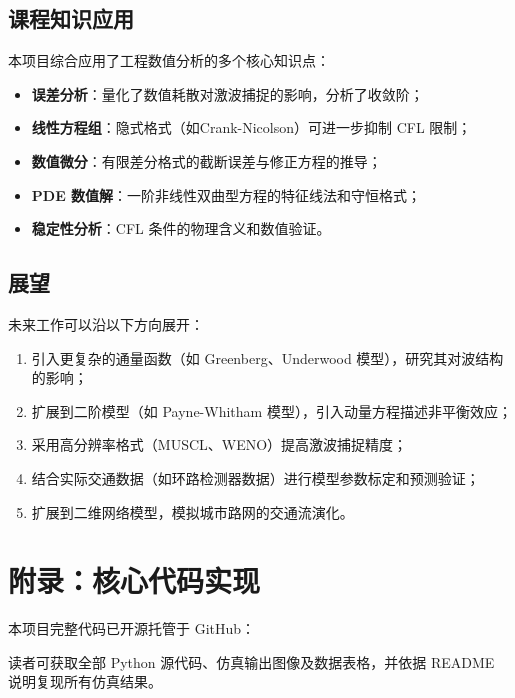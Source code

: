 \documentclass[12pt,a4paper]{ctexart}
\begin{document}
\subsection{课程知识应用}

本项目综合应用了工程数值分析的多个核心知识点：
\begin{itemize}
    \item \textbf{误差分析}：量化了数值耗散对激波捕捉的影响，分析了收敛阶；
    \item \textbf{线性方程组}：隐式格式（如Crank-Nicolson）可进一步抑制 CFL 限制；
    \item \textbf{数值微分}：有限差分格式的截断误差与修正方程的推导；
    \item \textbf{PDE 数值解}：一阶非线性双曲型方程的特征线法和守恒格式；
    \item \textbf{稳定性分析}：CFL 条件的物理含义和数值验证。
\end{itemize}

\subsection{展望}

未来工作可以沿以下方向展开：
\begin{enumerate}[label=(\arabic*)]
    \item 引入更复杂的通量函数（如 Greenberg、Underwood 模型），研究其对波结构的影响；
    \item 扩展到二阶模型（如 Payne-Whitham 模型），引入动量方程描述非平衡效应；
    \item 采用高分辨率格式（MUSCL、WENO）提高激波捕捉精度；
    \item 结合实际交通数据（如环路检测器数据）进行模型参数标定和预测验证；
    \item 扩展到二维网络模型，模拟城市路网的交通流演化。
\end{enumerate}


\newpage
\section*{附录：核心代码实现}

本项目完整代码已开源托管于 GitHub：
\begin{center}
\end{center}
读者可获取全部 Python 源代码、仿真输出图像及数据表格，并依据 README 说明复现所有仿真结果。
\end{document}
